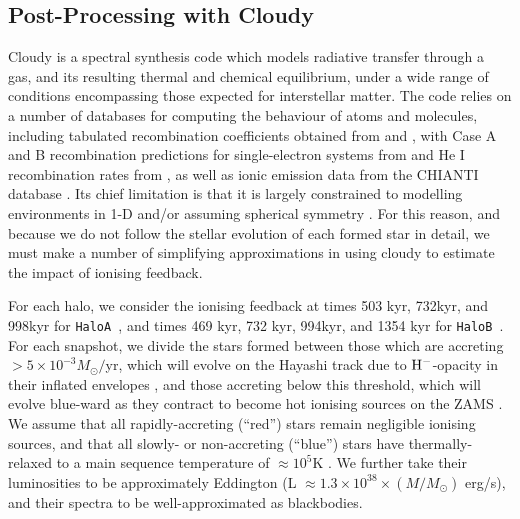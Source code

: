 \documentclass[graphics, twocolumn, usenatbib]{mn2e}
\newcommand{\ha} {\texttt{HaloA~}}
\newcommand{\hb} {\texttt{HaloB~}}
\begin{document}

\subsection{Post-Processing with Cloudy}
\label{cloudy:description}
{\sc Cloudy} \citep{Ferland_2017} is a spectral synthesis code which models radiative transfer through a gas, and its resulting thermal and chemical equilibrium, under a wide range of conditions encompassing those expected for interstellar matter. %
The code relies on a number of databases for computing the behaviour of atoms and molecules, including tabulated recombination coefficients obtained from \cite{Badnell_2003} and \cite{Badnell_2006}, with Case A and B recombination predictions for single-electron systems from \cite{Storey_1995} and He I recombination rates from \cite{Porter_2012}, as well as ionic emission data from the CHIANTI database \citep{Dere_1997,Dere_2012}. Its chief limitation is that it is largely constrained to modelling environments in 1-D and/or assuming spherical symmetry \citep[though see, e.g.,][for recent efforts to extend its implementation to pseudo-3-D problems]{Morisset_2013, Fitzgerald_2020}. For this reason, and because we do not follow the stellar evolution of each formed star in detail, we must make a number of simplifying approximations in using {\sc cloudy} to estimate the impact of ionising feedback. 

For each halo, we consider the ionising feedback at times 503 kyr, 732kyr, and 998kyr for \ha, and times 469 kyr, 732 kyr, 994kyr, and 1354 kyr for \hb. For each snapshot, we divide the stars formed between those which are accreting $> 5 \times 10^{-3} M_{\odot}/$yr, which will evolve on the Hayashi track due to $\rm{H}^{-}$-opacity in their inflated envelopes \citep[e.g.,][]{Hosokawa_2013}, and those accreting below this threshold, which will evolve blue-ward as they contract to become hot ionising sources on the ZAMS \citep{Haemmerle_2017}. We assume that all rapidly-accreting (``red'') stars remain negligible ionising sources, and that all slowly- or non-accreting (``blue'') stars have thermally-relaxed to a main sequence temperature of $\approx 10^{5}$K \citep{Schaerer_2002, Woods_2020}. We further take their luminosities to be approximately Eddington (L $\approx 1.3\times 10^{38} \times (M/M_{\odot})$ erg/s), and their spectra to be well-approximated as blackbodies.
\end{document}
